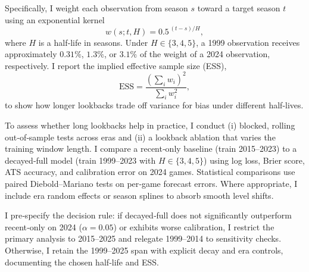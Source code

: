 Specifically, I weight each observation from season $s$ toward a target season $t$ using an exponential kernel
\begin{equation}
w(s; t, H) = 0.5^{\,(t - s)/H},
\end{equation}
where $H$ is a half‑life in seasons. Under $H\in\{3,4,5\}$, a 1999 observation receives approximately $0.31\%$, $1.3\%$, or $3.1\%$ of the weight of a 2024 observation, respectively. I report the implied effective sample size (ESS),
\begin{equation}
\mathrm{ESS} = \frac{\left(\sum_i w_i\right)^2}{\sum_i w_i^2},
\end{equation}
to show how longer lookbacks trade off variance for bias under different half‑lives.

To assess whether long lookbacks help in practice, I conduct (i) blocked, rolling out‑of‑sample tests across eras and (ii) a lookback ablation that varies the training window length. I compare a recent‑only baseline (train 2015--2023) to a decayed‑full model (train 1999--2023 with $H\in\{3,4,5\}$) using log loss, Brier score, ATS accuracy, and calibration error on 2024 games. Statistical comparisons use paired Diebold--Mariano tests on per‑game forecast errors. Where appropriate, I include era random effects or season splines to absorb smooth level shifts.

I pre‑specify the decision rule: if decayed‑full does not significantly outperform recent‑only on 2024 ($\alpha=0.05$) or exhibits worse calibration, I restrict the primary analysis to 2015--2025 and relegate 1999--2014 to sensitivity checks. Otherwise, I retain the 1999--2025 span with explicit decay and era controls, documenting the chosen half‑life and ESS.



